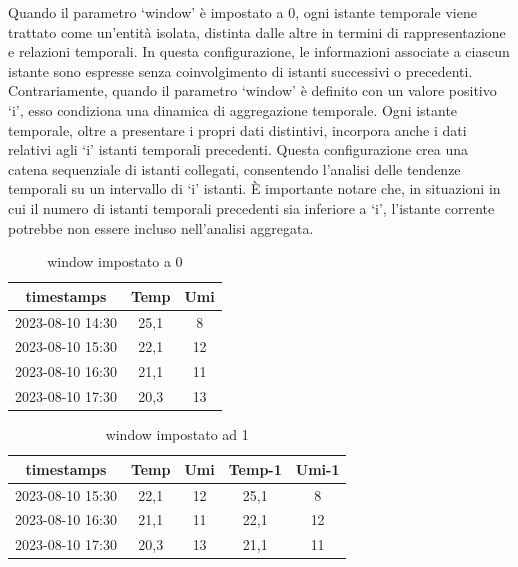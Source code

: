 \documentclass{rapportECL}
\begin{document}
Quando il parametro `window' è impostato a 0, ogni istante temporale viene trattato come un'entità isolata, distinta dalle altre in termini di 
rappresentazione e relazioni temporali. In questa configurazione, le informazioni associate a ciascun istante sono espresse senza coinvolgimento di 
istanti successivi o precedenti.
Contrariamente, quando il parametro `window' è definito con un valore positivo `i', esso condiziona una dinamica di aggregazione temporale. 
Ogni istante temporale, oltre a presentare i propri dati distintivi, incorpora anche i dati relativi agli `i' istanti temporali precedenti. 
Questa configurazione crea una catena sequenziale di istanti collegati, consentendo l'analisi delle tendenze temporali su un intervallo di `i' istanti. 
È importante notare che, in situazioni in cui il numero di istanti temporali precedenti sia inferiore a 
`i', l'istante corrente potrebbe non essere incluso nell'analisi aggregata.
\begin{table}[h]
  \centering
  \begin{tabular}{|c|c|c|}

    \hline
    timestamps & Temp & Umi\\
    \hline
    2023-08-10 14:30 & 25,1 & 8\\
    \hline
    2023-08-10 15:30 & 22,1 & 12\\
    \hline
    2023-08-10 16:30 & 21,1 & 11\\
    \hline
    2023-08-10 17:30 & 20,3 & 13\\
    \hline
  
  \end{tabular}
  
  \caption{window impostato a 0}
\end{table}


\begin{table}[h]
  \centering
  \begin{tabular}{|*{5}{c|}}
  
  \hline
  timestamps & Temp & Umi & Temp-1 & Umi-1\\
  \hline
  2023-08-10 15:30 & 22,1 & 12 & 25,1 & 8\\
  \hline
  2023-08-10 16:30 & 21,1 & 11 & 22,1 & 12\\
  \hline
  2023-08-10 17:30 & 20,3 & 13 & 21,1 & 11\\
  \hline
  
  \end{tabular}
  
  \caption{window impostato ad 1}
\end{table}
\end{document}
